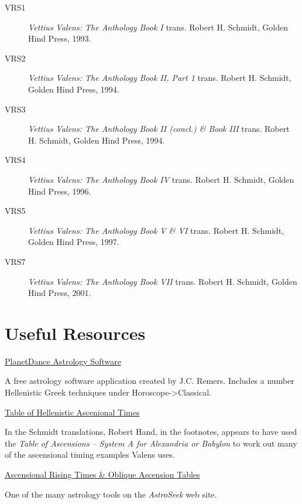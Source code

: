 \begin{description}
\item[VRS1] 
	\textsl{Vettius Valens: The Anthology Book I} trans. Robert H. Schmidt, Golden Hind Press, 1993.

\item[VRS2] 
	\textsl{Vettius Valens: The Anthology Book II, Part 1} trans. Robert H. Schmidt, Golden Hind Press, 1994.

\item[VRS3] 
	\textsl{Vettius Valens: The Anthology Book II (concl.) \& Book III} trans. Robert H. Schmidt, Golden Hind Press, 1994.

\item[VRS4] 
	\textsl{Vettius Valens: The Anthology Book IV} trans. Robert H. Schmidt, Golden Hind Press, 1996.

\item[VRS5] 
	\textsl{Vettius Valens: The Anthology Book V \& VI} trans. Robert H. Schmidt, Golden Hind Press, 1997.

\item[VRS7] 
	\textsl{Vettius Valens: The Anthology Book VII} trans. Robert H. Schmidt, Golden Hind Press, 2001.

\end{description}
\newpage

\section{Useful Resources}

\noindent\href{https://www.jcremers.com/}{PlanetDance Astrology Software}

	A free astrology software application created by J.C. Remers. Includes a number Hellenistic Greek techniques under Horoscope->Classical.


\noindent\href{http://www.projecthindsight.com/images/TablesPDFs/Tb2-AscT-sysAB.pdf}{Table of Hellenistic Ascenional Times}
	
	In the Schmidt translations, Robert Hand, in the footnotes, appears to have used the \textsl{Table of Ascensions – System A for Alexandria or Babylon} to work out many of the ascensional timing examples Valens uses.
	
	\noindent\href{https://horoscopes.astro-seek.com/calculate-ascensional-rising-times/?latitude=&narozeni_lat_custom_stupne=0&narozeni_lat_custom_minuty=0&narozeni_lat_custom_smer=0&narozeni_rok=2022&aya=&oa=&decimal=0}{Ascensional Rising Times \& Oblique Ascension Tables}
	
	One of the many astrology tools on the \textsl{AstroSeek} web site.
	
\newpage
